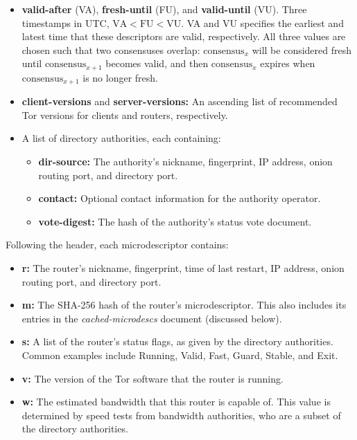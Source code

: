 \begin{itemize}
	\item \textbf{valid-after} (VA), \textbf{fresh-until} (FU), and \textbf{valid-until} (VU). Three timestamps in UTC, $ \mathrm{VA} < \mathrm{FU} < \mathrm{VU} $. VA and VU specifies the earliest and latest time that these descriptors are valid, respectively. All three values are chosen such that two consensuses overlap: $ \mathrm{consensus}_{x} $ will be considered fresh until $ \mathrm{consensus}_{x+1} $ becomes valid, and then $ \mathrm{consensus}_{x} $ expires when $ \mathrm{consensus}_{x+1} $ is no longer fresh.
	\item \textbf{client-versions} and \textbf{server-versions:} An ascending list of recommended Tor versions for clients and routers, respectively.
	\item A list of directory authorities, each containing:
		\begin{itemize}
			\item \textbf{dir-source:} The authority's nickname, fingerprint, IP address, onion routing port, and directory port.
			\item \textbf{contact:} Optional contact information for the authority operator.
			\item \textbf{vote-digest:} The hash of the authority's status vote document.
		\end{itemize}
\end{itemize}

Following the header, each microdescriptor contains:

\begin{itemize}
	\item \textbf{r:} The router's nickname, fingerprint, time of last restart, IP address, onion routing port, and directory port.
	\item \textbf{m:} The SHA-256 hash of the router's microdescriptor. This also includes its entries in the \emph{cached-microdescs} document (discussed below).
	\item \textbf{s:} A list of the router's status flags, as given by the directory authorities. Common examples include Running, Valid, Fast, Guard, Stable, and Exit.
	\item \textbf{v:} The version of the Tor software that the router is running.
	\item \textbf{w:} The estimated bandwidth that this router is capable of. This value is determined by speed tests from bandwidth authorities, who are a subset of the directory authorities.
\end{itemize}

